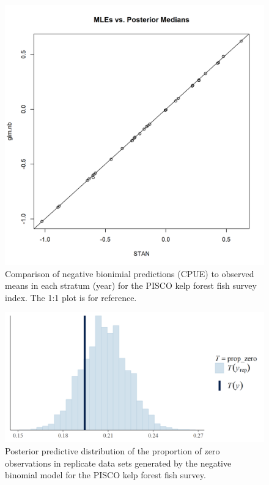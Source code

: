 \documentclass[12pt,]{article}
\begin{document}
\begin{figure}
\centering
\includegraphics{Figures/Fleet8_MLE_stan.png}
\caption{Comparison of negative bionimial predictions (CPUE) to observed
means in each stratum (year) for the PISCO kelp forest fish survey
index. The 1:1 plot is for reference. \label{fig:Fleet8_MLE_stan}}
\end{figure}

\FloatBarrier

\begin{figure}
\centering
\includegraphics{Figures/Fleet8_prop_zero_STAN.png}
\caption{Posterior predictive distribution of the proportion of zero
observations in replicate data sets generated by the negative binomial
model for the PISCO kelp forest fish survey.
\label{fig:Fleet8_prop_zero_STAN}}
\end{figure}
\end{document}
